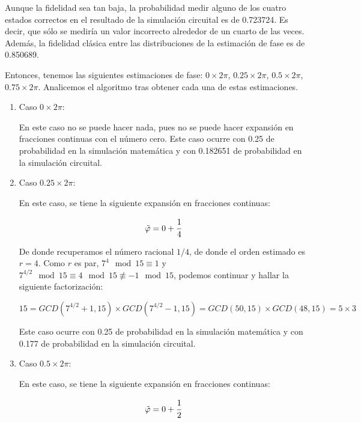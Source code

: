 Aunque la fidelidad sea tan baja, la probabilidad medir alguno de los cuatro estados correctos en el resultado de la simulación circuital es de 0.723724. Es decir, que sólo se mediría un valor incorrecto alrededor de un cuarto de las veces. Además, la fidelidad clásica entre las distribuciones de la estimación de fase es de 0.850689.

Entonces, tenemos las siguientes estimaciones de fase: $0 \times 2\pi$, $0.25 \times 2\pi$, $0.5 \times 2\pi$, $0.75 \times 2\pi$. Analicemos el algoritmo tras obtener cada una de estas estimaciones.

\begin{enumerate}
    \item Caso $0 \times 2\pi$:

        En este caso no se puede hacer nada, pues no se puede hacer expansión en fracciones continuas con el número cero. Este caso ocurre con 0.25 de probabilidad en la simulación matemática y con 0.182651 de probabilidad en la simulación circuital.

    \item Caso $0.25 \times 2\pi$:

        En este caso, se tiene la siguiente expansión en fracciones continuas:
        
        \begin{equation}
            \tilde{\varphi} = 0 + \cfrac{1}{4}
        \end{equation}
        
        De donde recuperamos el número racional $1/4$, de donde el orden estimado es $r = 4$. Como $r$ es par, $7^{4}\mod 15 \equiv 1$ y $7^{4/2}\mod 15 \equiv 4\mod 15 \not\equiv -1\mod 15$, podemos continuar y hallar la siguiente factorización:

        \begin{equation}
            15 = GCD(7^{4/2} + 1, 15) \times GCD(7^{4/2} - 1, 15) = GCD(50, 15) \times GCD(48, 15) = 5 \times 3
        \end{equation}

        Este caso ocurre con 0.25 de probabilidad en la simulación matemática y con 0.177 de probabilidad en la simulación circuital.

    \item Caso $0.5 \times 2\pi$:

        En este caso, se tiene la siguiente expansión en fracciones continuas:

        \begin{equation}
            \tilde{\varphi} = 0 + \cfrac{1}{2}
        \end{equation}
        

\end{enumerate}
